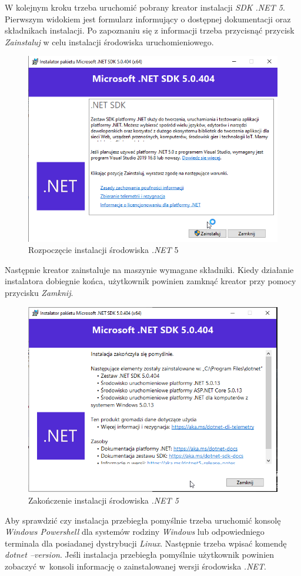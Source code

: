 \documentclass[a4paper,twoside,12pt]{book}
\begin{document}
W kolejnym kroku trzeba uruchomić pobrany kreator instalacji \textit{SDK .NET 5}. Pierwszym widokiem jest formularz informujący o dostępnej dokumentacji oraz składnikach instalacji. Po zapoznaniu się z informacji trzeba przycisnąć przycisk \textit{Zainstaluj} w celu instalacji środowiska uruchomieniowego.
\begin{figure}[h!]
	\centering
	\includegraphics[width=0.7\linewidth]{../zrzuty_ekranu/instalacja_dotnet5/dotnet1}
	\caption{Rozpoczęcie instalacji środowiska \textit{.NET }5}
	\label{fig:dotnet1}
\end{figure}
\FloatBarrier

Następnie kreator zainstaluje na maszynie wymagane składniki. Kiedy działanie instalatora dobiegnie końca, użytkownik powinien zamknąć kreator przy pomocy przycisku \textit{Zamknij}.

\begin{figure}[h!]
	\centering
	\includegraphics[width=0.7\linewidth]{../zrzuty_ekranu/instalacja_dotnet5/dotnet_finish}
	\caption{Zakończenie instalacji środowiska \textit{.NET 5}}
	\label{fig:dotnetfinish}
\end{figure}
\FloatBarrier

Aby sprawdzić czy instalacja przebiegła pomyślnie trzeba uruchomić konsolę \textit{Windows Powershell} dla systemów rodziny \textit{Windows} lub odpowiedniego terminala dla posiadanej dystrybucji \textit{Linux}. Następnie trzeba wpisać komendę \textit{dotnet --version}. Jeśli instalacja przebiegła pomyślnie użytkownik powinien zobaczyć w~konsoli informację o zainstalowanej wersji środowiska \textit{.NET}.
\end{document}
